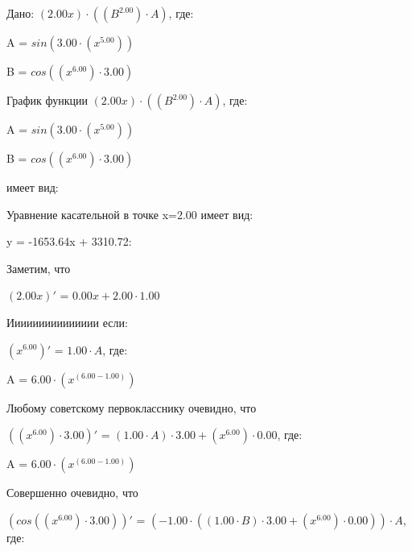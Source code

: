 \documentclass{article}
\begin{document}
Дано: $(2.00x) \cdot (({B}^{2.00}) \cdot A)$, где:

\bigskip\qquad A = $sin(3.00 \cdot ({x}^{5.00}))$

\qquad B = $cos(({x}^{6.00}) \cdot 3.00)$

\bigskip График функции $(2.00x) \cdot (({B}^{2.00}) \cdot A)$, где:

\bigskip\qquad A = $sin(3.00 \cdot ({x}^{5.00}))$

\qquad B = $cos(({x}^{6.00}) \cdot 3.00)$

имеет вид:

\begin{figure}[h]\label{fig:t}\end{figure}Уравнение касательной в точке x=2.00 имеет вид:

y = -1653.64x + 3310.72:

\bigskip Заметим, что

$(2.00x)'$ = $0.00x + 2.00 \cdot 1.00$

\bigskip Иииииииииииииии если:

$({x}^{6.00})'$ = $1.00 \cdot A$, где:

\bigskip\qquad A = $6.00 \cdot ({x}^{(6.00 - 1.00)})$



\bigskip Любому советскому первокласснику очевидно, что

$(({x}^{6.00}) \cdot 3.00)'$ = $(1.00 \cdot A) \cdot 3.00 + ({x}^{6.00}) \cdot 0.00$, где:

\bigskip\qquad A = $6.00 \cdot ({x}^{(6.00 - 1.00)})$



\bigskip Совершенно очевидно, что

$(cos(({x}^{6.00}) \cdot 3.00))'$ = $(-1.00 \cdot ((1.00 \cdot B) \cdot 3.00 + ({x}^{6.00}) \cdot 0.00)) \cdot A$, где:
\end{document}
